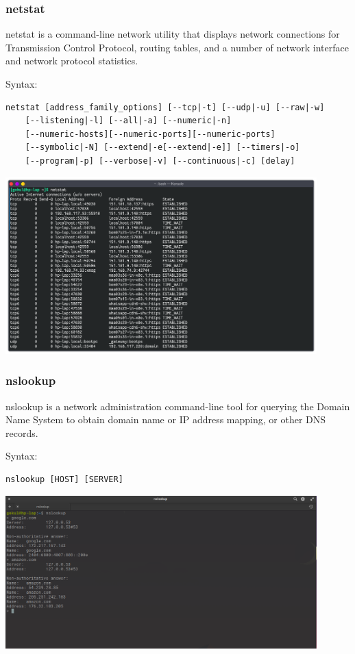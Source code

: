 \subsubsection{netstat}
netstat is a command-line network utility that displays network connections 
for Transmission Control Protocol, routing tables, and a number of network interface 
and network protocol statistics.
\linebreak[2]

Syntax:
\begin{lstlisting}
netstat [address_family_options] [--tcp|-t] [--udp|-u] [--raw|-w] 
	[--listening|-l] [--all|-a] [--numeric|-n] 
	[--numeric-hosts][--numeric-ports][--numeric-ports] 
	[--symbolic|-N] [--extend|-e[--extend|-e]] [--timers|-o] 
	[--program|-p] [--verbose|-v] [--continuous|-c] [delay]
\end{lstlisting}

\begin{center}
	\includegraphics[width=0.90\textwidth]{img/p1/ss4.png}
\end{center}


\subsubsection{nslookup}
nslookup is a network administration command-line tool for querying the 
Domain Name System to obtain domain name or IP address mapping, or other DNS records.
\linebreak[2]

Syntax:
\begin{lstlisting}
nslookup [HOST] [SERVER]
\end{lstlisting}

\begin{center}
	\includegraphics[width=0.90\textwidth]{img/p1/ss5.png}
\end{center}


